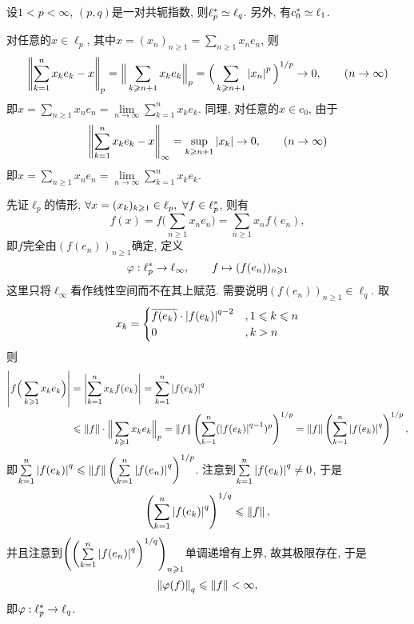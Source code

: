     \begin{Proposition}
        设$ 1<p<\infty $, $ (p,q) $是一对共轭指数, 则$ \ell_p^{*}\simeq\ell_q $. 另外, 有$ c_0^{*}\simeq\ell_1 $.
    \end{Proposition}
    \begin{Proof}
        对任意的$ x\in\ell_p $, 其中$ x=(x_n)_{n\geqslant 1}=\sum\limits_{n\geqslant 1}x_ne_n $, 则
        \[
        \left\| \sum_{k=1}^nx_ke_k-x \right\|_p=\Big\| \sum_{k\geqslant n+1}x_ke_k \Big\|_p=\Big(\sum_{k\geqslant n+1}\left| x_n \right| ^p\Big)^{1/p}\to 0,\qquad(n\to\infty)
        \]
        即$ x=\sum\limits_{n\geqslant 1}x_ne_n=\lim\limits_{n\to\infty}\sum\limits_{k=1}^nx_ke_k $. 同理, 对任意的$ x\in c_0 $, 由于
        \[
        \left\| \sum_{k=1}^nx_ke_k-x \right\|_\infty=\sup_{k\geqslant n+1}\left| x_k \right| \to 0,\qquad(n\to\infty)
        \]
        即$ x=\sum\limits_{n\geqslant 1}x_ne_n=\lim\limits_{n\to\infty}\sum\limits_{k=1}^nx_ke_k $.
        
        先证$ \ell_p $的情形, $ \forall x=(x_k)_{k\geqslant 1}\in\ell_p,\ \forall f\in\Star{\ell_p} $, 则有
        \[
        f(x)=f\Big( \sum_{n\geqslant 1}x_ne_n \Big)=\sum_{n\geqslant 1}x_nf(e_n),
        \]
        即$ f $完全由$ (f(e_n))_{n\geqslant 1} $确定, 定义
        \[
        \varphi : \ell_p^{*}\to\ell_\infty,\qquad f\mapsto(f(e_n))_{n\geqslant 1}
        \]
        这里只将$ \ell_\infty $看作线性空间而不在其上赋范. 需要说明$ (f(e_n))_{n\geqslant 1}\in\ell_q $. 取
        \[
        x_k=\begin{cases}
        \overline{f(e_k)}\cdot\left| f(e_k) \right| ^{q-2} & ,1\leqslant k\leqslant n\\
        0 & , k>n\\
        \end{cases}
        \]
        则
        \[
        \begin{aligned}
        \left| f\Big(\sum_{k\geqslant 1}x_ke_k\Big) \right| &=\left| \sum_{k=1}^nx_kf(e_k) \right| =\sum_{k=1}^n\left| f(e_k) \right| ^q\\
        &\leqslant\left\| f \right\|\cdot\Big\| \sum_{k\geqslant 1}x_ke_k \Big\|_p=\left\| f \right\|\left(\sum_{k=1}^n(\left| f(e_k) \right| ^{q-1})^p\right)^{1/p}=\left\| f \right\|\left(\sum_{k=1}^n\left| f(e_k) \right| ^q\right)^{1/p},
        \end{aligned}
        \]
        即$ \sum\limits_{k=1}^n\left| f(e_k) \right| ^q\leqslant\left\| f \right\|\left(\sum\limits_{k=1}^n\left| f(e_n) \right| ^q\right)^{1/p} $. 注意到$ \sum\limits_{k=1}^n\left| f(e_k) \right| ^q\ne 0 $, 于是
        \[
        \left(\sum_{k=1}^n\left| f(e_k) \right| ^q\right)^{1/q}\leqslant\left\| f \right\|,
        \]
        并且注意到$ \left(\left(\sum\limits_{k=1}^n\left| f(e_n) \right| ^q\right)^{1/q}\right)_{n\geqslant 1} $单调递增有上界, 故其极限存在, 于是
        \[
        \left\| \varphi(f) \right\|_q\leqslant\left\| f \right\|<\infty,
        \]
        即$ \varphi : \ell_p^{*}\to\ell_q $.
        

\end{Proof}
